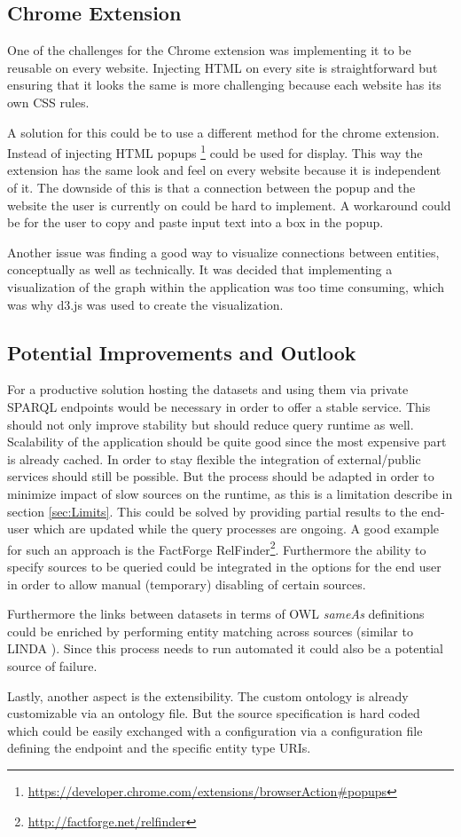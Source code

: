 \subsection{Chrome Extension}
One of the challenges for the Chrome extension was implementing it to be reusable on every website. Injecting HTML on every site is straightforward but ensuring that it looks the same is more challenging because each website has its own CSS rules.

A solution for this could be to use a different method for the chrome extension. Instead of injecting HTML popups \footnote{\url{https://developer.chrome.com/extensions/browserAction\#popups}} could be used for display. This way the extension has the same look and feel on every website because it is independent of it. The downside of this is that a connection between the popup and the website the user is currently on could be hard to implement. A workaround could be for the user to copy and paste input text into a box in the popup. 

Another issue was finding a good way to visualize connections between entities, conceptually as well as technically. It was decided that implementing a visualization of the graph within the application was too time consuming, which was why d3.js was used to create the visualization.




\subsection{Potential Improvements and Outlook}
For a productive solution hosting the datasets and using them via private SPARQL endpoints would be necessary in order to offer a stable service. This should not only improve stability but should reduce query runtime as well. Scalability of the application should be quite good since the most expensive part is already cached. 
In order to stay flexible the integration of external/public services should still be possible. But the process should be adapted in order to minimize impact of slow sources on the runtime, as this is a limitation describe in section \ref{sec:Limits}. This could be solved by providing partial results to the end-user which are updated while the query processes are ongoing. A good example for such an approach is the FactForge RelFinder\footnote{\url{http://factforge.net/relfinder}}. Furthermore the ability to specify sources to be queried could be integrated in the options for the end user in order to allow manual (temporary) disabling of certain sources. 

Furthermore the links between datasets in terms of OWL \textit{sameAs} definitions could be enriched by performing entity matching across sources (similar to LINDA \cite{boehm_linda:_2012}). Since this process needs to run automated it could also be a potential source of failure. 

Lastly, another aspect is the extensibility. The custom ontology is already customizable via an ontology file. But the source specification is hard coded which could be easily exchanged with a configuration via a configuration file defining the endpoint and the specific entity type URIs. 



